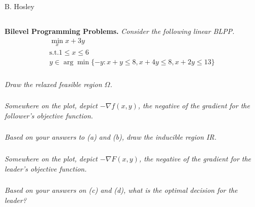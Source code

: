 \documentclass[12pt]{amsart}
\begin{document}
\raggedbottom

\hspace{\fill} {\large B. Hosley}
\bigskip


\setcounter{subsection}{0}
\subsection{}
\textbf{Bilevel Programming Problems.} 
\textit{Consider the following linear BLPP.}
\begin{align*}
	\min_x		x+3y \\
	\text{s.t.}	1 \leq x \leq 6 \\
	y \in \arg\min \{ -y : x + y \leq 8, x + 4y \leq 8, x + 2y \leq 13 \}
\end{align*}

%
%

\subsubsection{}
\textit{Draw the relaxed feasible region $\Omega$.}

\subsubsection{}
\textit{Somewhere on the plot, depict $-\nabla f(x,y)$, the negative of the gradient for the follower’s objective function.}

\subsubsection{}
\textit{Based on your answers to (a) and (b), draw the inducible region IR.}

\subsubsection{}
\textit{Somewhere on the plot, depict $-\nabla F(x,y)$, the negative of the gradient for the leader’s objective function.}

\subsubsection{}
\textit{Based on your answers on (c) and (d), what is the optimal decision for the leader?}
\end{document}
